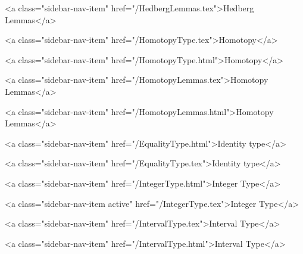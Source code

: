       
    
      
        
          <a class="sidebar-nav-item" href="/HedbergLemmas.tex">Hedberg Lemmas</a>
        
      
    
      
        
          <a class="sidebar-nav-item" href="/HomotopyType.tex">Homotopy</a>
        
      
    
      
        
          <a class="sidebar-nav-item" href="/HomotopyType.html">Homotopy</a>
        
      
    
      
        
          <a class="sidebar-nav-item" href="/HomotopyLemmas.tex">Homotopy Lemmas</a>
        
      
    
      
        
          <a class="sidebar-nav-item" href="/HomotopyLemmas.html">Homotopy Lemmas</a>
        
      
    
      
        
          <a class="sidebar-nav-item" href="/EqualityType.html">Identity type</a>
        
      
    
      
        
          <a class="sidebar-nav-item" href="/EqualityType.tex">Identity type</a>
        
      
    
      
        
          <a class="sidebar-nav-item" href="/IntegerType.html">Integer Type</a>
        
      
    
      
        
          <a class="sidebar-nav-item active" href="/IntegerType.tex">Integer Type</a>
        
      
    
      
        
          <a class="sidebar-nav-item" href="/IntervalType.tex">Interval Type</a>
        
      
    
      
        
          <a class="sidebar-nav-item" href="/IntervalType.html">Interval Type</a>
        
